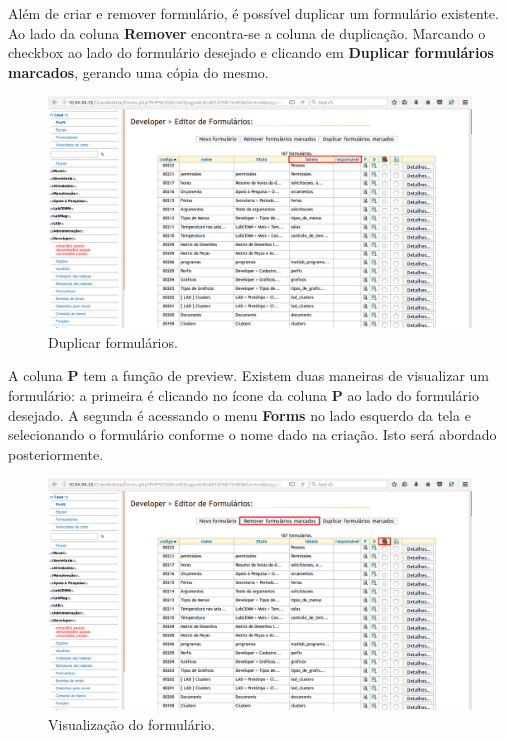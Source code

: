 \documentclass[9pt]{report}
\begin{document}
{    Além de criar e remover formulário, é possível  duplicar um
    formulário existente. Ao lado da coluna \textbf{Remover}
    encontra-se a coluna de duplicação. Marcando o checkbox ao lado
    do formulário desejado e clicando em
    \textbf{Duplicar formulários marcados}, gerando uma cópia do
    mesmo.
    
    \begin{figure}[H]
      \includegraphics[width=\textwidth]{2_Formularios/1_Editor_de_formularios/5.png}
      \caption{Duplicar formulários.}
      \label{fig:duplicarform}
    \end{figure}
    
    A coluna \textbf{P} tem a função de preview. Existem duas
    maneiras de visualizar um formulário: a primeira é clicando no
    ícone da coluna \textbf{P} ao lado do formulário desejado. A
    segunda é acessando o menu \textbf{Forms} no lado esquerdo da
    tela e selecionando o formulário conforme o nome dado na criação.
    Isto será abordado posteriormente.
    
    \begin{figure}[H]
      \includegraphics[width=\textwidth]{2_Formularios/1_Editor_de_formularios/6.png}
      \caption{Visualização do formulário.}
      \label{fig:preview}
    \end{figure}

}
\end{document}
